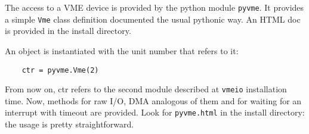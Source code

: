 \documentclass{article}
\begin{document}
The access to a VME device is provided by the python module
\verb|pyvme|. It provides a simple \verb|Vme| class definition
documented the usual pythonic way. An HTML doc is provided in the
install directory.

An object is instantiated with the unit number that refers to it:
\begin{Verbatim}
	ctr = pyvme.Vme(2)
\end{Verbatim}
From now on, ctr refers to the second module described at \verb|vmeio|
installation time. Now, methods for raw I/O, DMA analogous of them and
for waiting for an interrupt with timeout are provided. Look for
\verb|pyvme.html| in the install directory: the usage is pretty
straightforward.
\end{document}
